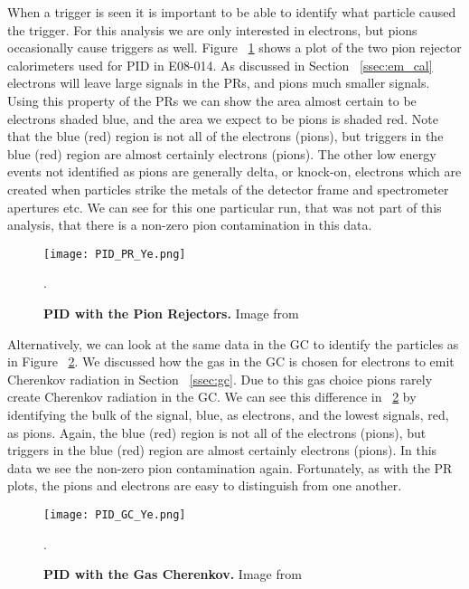When a trigger is seen it is important to be able to identify what particle caused the trigger. For this analysis we are only interested in electrons, but pions occasionally cause triggers as well. Figure ~\ref{fig:pid_pr_ye} shows a plot of the two pion rejector calorimeters used for PID in E08-014. As discussed in Section ~\ref{ssec:em_cal} electrons will leave large signals in the PRs, and pions much smaller signals. Using this property of the PRs we can show the area almost certain to be electrons shaded blue, and the area we expect to be pions is shaded red. Note that the blue (red) region is not all of the electrons (pions), but triggers in the blue (red) region are almost certainly electrons (pions). The other low energy events not identified as pions are generally delta, or knock-on, electrons which are created when particles strike the metals of the detector frame and spectrometer apertures etc. We can see for this one particular run, that was not part of this analysis, that there is a non-zero pion contamination in this data. 

\begin{figure}[!ht]
\begin{center}
\texttt{[image: PID\_PR\_Ye.png]}
\end{center}
\caption{
{\bf{PID with the Pion Rejectors.}} Image from ~\cite{Thesis:Ye}}.
\label{fig:pid_pr_ye}
\end{figure}

Alternatively, we can look at the same data in the GC to identify the particles as in Figure ~\ref{fig:pid_gc_ye}. We discussed how the gas in the GC is chosen for electrons to emit Cherenkov radiation in Section ~\ref{ssec:gc}. Due to this gas choice pions rarely create Cherenkov radiation in the GC. We can see this difference in ~\ref{fig:pid_gc_ye} by identifying the bulk of the signal, blue, as electrons, and the lowest signals, red, as pions. Again, the blue (red) region is not all of the electrons (pions), but triggers in the blue (red) region are almost certainly electrons (pions). In this data we see the non-zero pion contamination again. Fortunately, as with the PR plots, the pions and electrons are easy to distinguish from one another.

\begin{figure}[!ht]
\begin{center}
\texttt{[image: PID\_GC\_Ye.png]}
\end{center}
\caption{
{\bf{PID with the Gas Cherenkov.}} Image from ~\cite{Thesis:Ye}}.
\label{fig:pid_gc_ye}
\end{figure}

